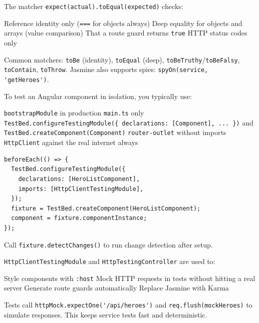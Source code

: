 \question[4]
The matcher \lstinline[style=tsinline]|expect(actual).toEqual(expected)| checks:
\begin{choices}
  \choice Reference identity only (\lstinline[style=tsinline]|===| for objects always)
  \CorrectChoice Deep equality for objects and arrays (value comparison)
  \choice That a route guard returns \texttt{true}
  \choice HTTP status codes only
\end{choices}
\begin{solution}
  Common matchers: \lstinline[style=tsinline]|toBe| (identity), \lstinline[style=tsinline]|toEqual| (deep), \lstinline[style=tsinline]|toBeTruthy|/\lstinline[style=tsinline]|toBeFalsy|, \lstinline[style=tsinline]|toContain|, \lstinline[style=tsinline]|toThrow|. Jasmine also supports spies: \lstinline[style=tsinline]|spyOn(service, 'getHeroes')|.
\end{solution}

\question[4]
To test an Angular component in isolation, you typically use:
\begin{choices}
  \choice \lstinline[style=tsinline]|bootstrapModule| in production \texttt{main.ts} only
  \CorrectChoice \lstinline[style=tsinline]|TestBed.configureTestingModule({ declarations: [Component], ... })| and \lstinline[style=tsinline]|TestBed.createComponent(Component)|
  \choice \lstinline[style=htmlinline]|router-outlet| without imports
  \choice \texttt{HttpClient} against the real internet always
\end{choices}
\begin{solution}
\begin{lstlisting}[style=ts]
beforeEach(() => {
  TestBed.configureTestingModule({
    declarations: [HeroListComponent],
    imports: [HttpClientTestingModule],
  });
  fixture = TestBed.createComponent(HeroListComponent);
  component = fixture.componentInstance;
});
\end{lstlisting}
  Call \lstinline[style=tsinline]|fixture.detectChanges()| to run change detection after setup.
\end{solution}

\question[4]
\texttt{HttpClientTestingModule} and \texttt{HttpTestingController} are used to:
\begin{choices}
  \choice Style components with \lstinline[style=htmlinline]|:host|
  \CorrectChoice Mock HTTP requests in tests without hitting a real server
  \choice Generate route guards automatically
  \choice Replace Jasmine with Karma
\end{choices}
\begin{solution}
  Tests call \lstinline[style=tsinline]|httpMock.expectOne('/api/heroes')| and \lstinline[style=tsinline]|req.flush(mockHeroes)| to simulate responses. This keeps service tests fast and deterministic.
\end{solution}

